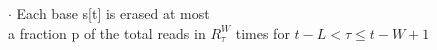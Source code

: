 \documentclass[preview]{standalone}
\begin{document}
\begin{center}
$\cdot$ Each base s[t] is erased at most\\ a fraction p of the total reads in $R^W_{\tau}$ times for $t-L < \tau \le t-W+1$
\end{center}
\end{document}
